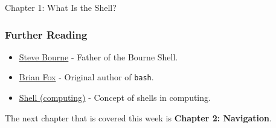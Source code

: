 \begin{notes}{Chapter 1: What Is the Shell?}
    \subsubsection*{Further Reading}

    \begin{itemize}
        \item \href{http://en.wikipedia.org/wiki/Steve_Bourne}{Steve Bourne} - Father of the Bourne Shell.
        \item \href{https://en.wikipedia.org/wiki/Brian_Fox_(computer_programmer)}{Brian Fox} - Original author of \texttt{bash}.
        \item \href{http://en.wikipedia.org/wiki/Shell_(computing)}{Shell (computing)} - Concept of shells in computing.
    \end{itemize}
\end{notes}

The next chapter that is covered this week is \textbf{Chapter 2: Navigation}.

